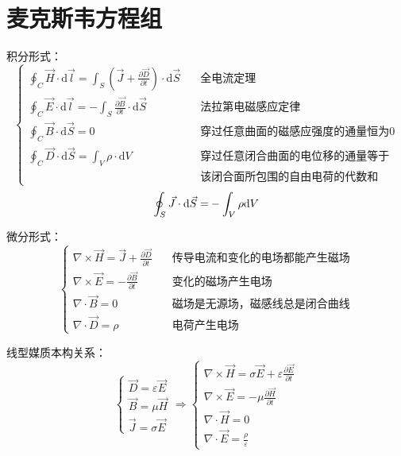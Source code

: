 \section{麦克斯韦方程组}
积分形式：
$$\left\{
	\begin{aligned}
		\oint_C\vec{H}\cdot\mathrm{d}\vec{l} = \int_S(\vec{J}+\frac{\partial \vec{D}}{\partial t})\cdot\mathrm{d}\vec{S}&\quad\text{全电流定理} \\
		\oint_C\vec{E}\cdot\mathrm{d}\vec{l} = -\int_S\frac{\partial \vec{B}}{\partial t}\cdot\mathrm{d}\vec{S}&\quad\text{法拉第电磁感应定律} \\
		\oint_C\vec{B}\cdot\mathrm{d}\vec{S} = 0&\quad\text{穿过任意曲面的磁感应强度的通量恒为0} \\
		\oint_C\vec{D}\cdot\mathrm{d}\vec{S} = \int_V\rho\cdot\mathrm{d}V&\quad\text{穿过任意闭合曲面的电位移的通量等于} \\
		&\quad\text{该闭合面所包围的自由电荷的代数和}
	\end{aligned}
\right.$$
$$\oint_{S} { \vec J \cdot {\rm{d}}\vec S = }  - \int_{V} {\rho {\rm{d}}V} $$

微分形式：
$$\left\{
\begin{aligned}
	\nabla\times\vec{H}=\vec{J}+\frac{\partial \vec{D}}{\partial t}&\quad\text{传导电流和变化的电场都能产生磁场} \\
	\nabla\times\vec{E} = -\frac{\partial \vec{B}}{\partial t}&\quad\text{变化的磁场产生电场} \\
	\nabla\cdot\vec{B} = 0&\quad\text{磁场是无源场，磁感线总是闭合曲线} \\
	\nabla\cdot\vec{D} = \rho&\quad\text{电荷产生电场} 
\end{aligned}
\right.$$

线型媒质本构关系：
$$\left\{
\begin{aligned}
	\vec{D} = \varepsilon\vec{E} \\
	\vec{B} = \mu\vec{H} \\
	\vec{J} = \sigma\vec{E}
\end{aligned}
\right.\Rightarrow\left\{
\begin{aligned}
	\nabla\times\vec{H}=\sigma\vec{E}+\varepsilon\frac{\partial \vec{E}}{\partial t} \\
	\nabla\times\vec{E} = -\mu\frac{\partial \vec{H}}{\partial t} \\
	\nabla\cdot\vec{H} = 0 \\
	\nabla\cdot\vec{E} = \frac{\rho}{\varepsilon}
\end{aligned}
\right.
$$
